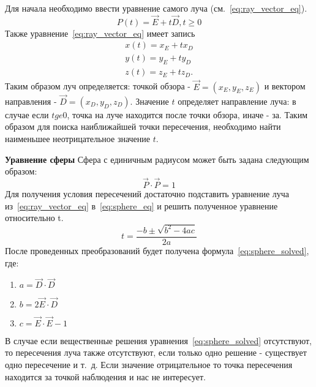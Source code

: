 Для начала необходимо ввести уравнение самого луча (см.~\ref{eq:ray_vector_eq}).
\begin{equation} 
	P(t) = \vec{E} +t\vec{D},t \ge 0
	\label{eq:ray_vector_eq}
\end{equation}
Также уравнение~\ref{eq:ray_vector_eq} имеет запись
\begin{equation}
	\label{eq:ray_scalar_eq}
	\begin{aligned}
		x(t) = x_E + t x_D \\
		y(t) = y_E + t y_D \\
		z(t) = z_E + t z_D.
	\end{aligned}
\end{equation}
Таким образом луч определяется: точкой обзора - $\vec{E} = (x_E,y_E,z_E)$ и вектором направления - $\vec{D} = (x_D,y_D,z_D)$. Значение $t$  определяет направление луча: в случае если $t ge 0$,
точка на луче находится после точки обзора, иначе - за. Таким образом для поиска наиближайшей точки пересечения, необходимо найти наименьшее неотрицательное значение $t$.\cite{Rodgers,primitives_raytracing_equations} 


\textbf{Уравнение сферы}
Сфера с единичным радиусом может быть задана следующим образом:
\begin{equation}
	\vec{P} \cdot \vec{P}=1
	\label{eq:sphere_eq}
\end{equation}
Для получения условия пересечений достаточно подставить уравнение луча из~\ref{eq:ray_vector_eq} в~\ref{eq:sphere_eq} и решить полученное уравнение относительно t.
\begin{equation}
	t=\frac{-b\pm\sqrt{b^2-4ac}}{2a}
	\label{eq:sphere_solved}
\end{equation}
После проведенных преобразований будет получена формула~\ref{eq:sphere_solved}, где:
\begin{enumerate}
	\item $a = \vec{D} \cdot \vec{D}$ 
	\item $b = 2\vec{E} \cdot \vec{D}$ 
	\item $c = \vec{E} \cdot \vec{E} - 1$
\end{enumerate}
В случае если вещественные решения уравнения~\ref{eq:sphere_solved} отсутствуют, то пересечения луча также отсутствуют, если только одно решение  - существует одно
пересечение и т.~д. Если значение отрицательное то точка пересечения находится за точкой наблюдения и нас не интересует.\cite{primitives_raytracing_equations}

